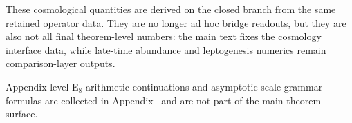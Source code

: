 \begin{remark}
These cosmological quantities are derived on the closed branch from the same retained operator
data. They are no longer ad hoc bridge readouts, but they are also not all final theorem-level
numbers: the main text fixes the cosmology interface data, while late-time abundance and
leptogenesis numerics remain comparison-layer outputs.
\end{remark}

Appendix-level E$_8$ arithmetic continuations and asymptotic scale-grammar formulas are collected
in Appendix~ and are not part of the main theorem surface.

